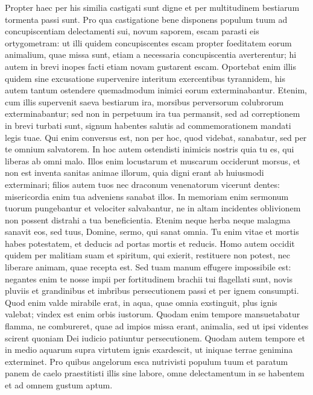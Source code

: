 \begin{biblechapter}  
\verse Propter haec per his similia castigati sunt digne et per multitudinem bestiarum tormenta passi sunt. 
\verse Pro qua castigatione bene disponens populum tuum ad concupiscentiam delectamenti sui, novum saporem, escam parasti eis ortygometram: 
\verse ut illi quidem concupiscentes escam propter foeditatem eorum animalium, quae missa sunt, etiam a necessaria concupiscentia averterentur; hi autem in brevi inopes facti etiam novam gustarent escam. 
\verse Oportebat enim illis quidem sine excusatione supervenire interitum exercentibus tyrannidem, his autem tantum ostendere quemadmodum inimici eorum exterminabantur. 
\verse Etenim, cum illis supervenit saeva bestiarum ira, morsibus perversorum colubrorum exterminabantur; sed non in perpetuum ira tua permansit, 
\verse sed ad correptionem in brevi turbati sunt, signum habentes salutis ad commemorationem mandati legis tuae. 
\verse Qui enim conversus est, non per hoc, quod videbat, sanabatur, sed per te omnium salvatorem. 
\verse In hoc autem ostendisti inimicis nostris quia tu es, qui liberas ab omni malo. 
\verse Illos enim locustarum et muscarum occiderunt morsus, et non est inventa sanitas animae illorum, quia digni erant ab huiusmodi exterminari; 
\verse filios autem tuos nec draconum venenatorum vicerunt dentes: misericordia enim tua adveniens sanabat illos. 
\verse In memoriam enim sermonum tuorum pungebantur et velociter salvabantur, ne in altam incidentes oblivionem non possent distrahi a tua beneficientia. 
\verse Etenim neque herba neque malagma sanavit eos, sed tuus, Domine, sermo, qui sanat omnia. 
\verse Tu enim vitae et mortis habes potestatem, et deducis ad portas mortis et reducis. 
\verse Homo autem occidit quidem per malitiam suam et spiritum, qui exierit, restituere non potest, nec liberare animam, quae recepta est. 
\verse Sed tuam manum effugere impossibile est: 
\verse negantes enim te nosse impii per fortitudinem brachii tui flagellati sunt, novis pluviis et grandinibus et imbribus persecutionem passi et per ignem consumpti. 
\verse Quod enim valde mirabile erat, in aqua, quae omnia exstinguit, plus ignis valebat; vindex est enim orbis iustorum. 
\verse Quodam enim tempore mansuetabatur flamma, ne combureret, quae ad impios missa erant, animalia, sed ut ipsi videntes scirent quoniam Dei iudicio patiuntur persecutionem. 
\verse Quodam autem tempore et in medio aquarum supra virtutem ignis exardescit, ut iniquae terrae genimina exterminet. 
\verse Pro quibus angelorum esca nutrivisti populum tuum et paratum panem de caelo praestitisti illis sine labore, omne delectamentum in se habentem et ad omnem gustum aptum. 

\end{biblechapter}
